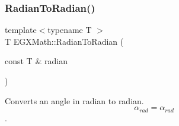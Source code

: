 \mbox{\label{group___e_g_x_math-_angle_conversions-_radian_gae08681bd86b8e7e4325f6c8cb3a0dc37}} 
\subsubsection{\texorpdfstring{Radian\+To\+Radian()}{RadianToRadian()}}
{\footnotesize\ttfamily template$<$typename T $>$ \\
T E\+G\+X\+Math\+::\+Radian\+To\+Radian (\begin{DoxyParamCaption}\item[{const T \&}]{radian }\end{DoxyParamCaption})}



Converts an angle in radian to radian. \[\alpha_{rad}=\alpha_{rad}\]. 

